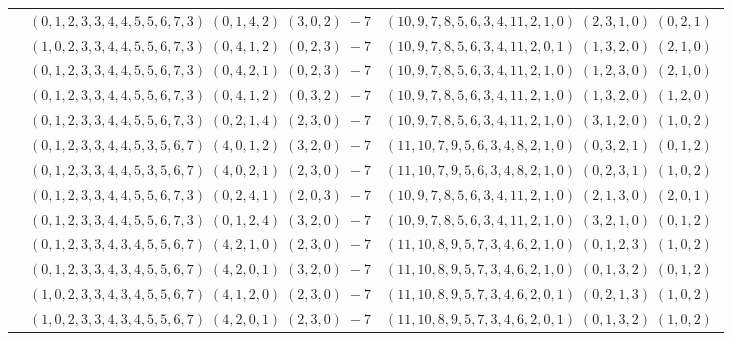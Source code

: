 \documentclass[11pt]{article}
\begin{document}
\begin{longtable}[l]{|c|c|c|}
 \cline{2-3} 
 & $(0 ,1 ,2 ,3 ,3 ,4 ,4 ,5 ,5 ,6 ,7 ,3) \;(0 ,1 ,4 ,2) \;(3 ,0 ,2) \;-7$ & $(10 ,9 ,7 ,8 ,5 ,6 ,3 ,4 ,11 ,2 ,1 ,0) \;(2 ,3 ,1 ,0) \;(0 ,2 ,1) \;$\\ 
 \cline{2-3} 
 & $(1 ,0 ,2 ,3 ,3 ,4 ,4 ,5 ,5 ,6 ,7 ,3) \;(0 ,4 ,1 ,2) \;(0 ,2 ,3) \;-7$ & $(10 ,9 ,7 ,8 ,5 ,6 ,3 ,4 ,11 ,2 ,0 ,1) \;(1 ,3 ,2 ,0) \;(2 ,1 ,0) \;$\\ 
 \cline{2-3} 
 & $(0 ,1 ,2 ,3 ,3 ,4 ,4 ,5 ,5 ,6 ,7 ,3) \;(0 ,4 ,2 ,1) \;(0 ,2 ,3) \;-7$ & $(10 ,9 ,7 ,8 ,5 ,6 ,3 ,4 ,11 ,2 ,1 ,0) \;(1 ,2 ,3 ,0) \;(2 ,1 ,0) \;$\\ 
 \cline{2-3} 
 & $(0 ,1 ,2 ,3 ,3 ,4 ,4 ,5 ,5 ,6 ,7 ,3) \;(0 ,4 ,1 ,2) \;(0 ,3 ,2) \;-7$ & $(10 ,9 ,7 ,8 ,5 ,6 ,3 ,4 ,11 ,2 ,1 ,0) \;(1 ,3 ,2 ,0) \;(1 ,2 ,0) \;$\\ 
 \cline{2-3} 
 & $(0 ,1 ,2 ,3 ,3 ,4 ,4 ,5 ,5 ,6 ,7 ,3) \;(0 ,2 ,1 ,4) \;(2 ,3 ,0) \;-7$ & $(10 ,9 ,7 ,8 ,5 ,6 ,3 ,4 ,11 ,2 ,1 ,0) \;(3 ,1 ,2 ,0) \;(1 ,0 ,2) \;$\\ 
 \cline{2-3} 
 & $(0 ,1 ,2 ,3 ,3 ,4 ,4 ,5 ,3 ,5 ,6 ,7) \;(4 ,0 ,1 ,2) \;(3 ,2 ,0) \;-7$ & $(11 ,10 ,7 ,9 ,5 ,6 ,3 ,4 ,8 ,2 ,1 ,0) \;(0 ,3 ,2 ,1) \;(0 ,1 ,2) \;$\\ 
 \cline{2-3} 
 & $(0 ,1 ,2 ,3 ,3 ,4 ,4 ,5 ,3 ,5 ,6 ,7) \;(4 ,0 ,2 ,1) \;(2 ,3 ,0) \;-7$ & $(11 ,10 ,7 ,9 ,5 ,6 ,3 ,4 ,8 ,2 ,1 ,0) \;(0 ,2 ,3 ,1) \;(1 ,0 ,2) \;$\\ 
 \cline{2-3} 
 & $(0 ,1 ,2 ,3 ,3 ,4 ,4 ,5 ,5 ,6 ,7 ,3) \;(0 ,2 ,4 ,1) \;(2 ,0 ,3) \;-7$ & $(10 ,9 ,7 ,8 ,5 ,6 ,3 ,4 ,11 ,2 ,1 ,0) \;(2 ,1 ,3 ,0) \;(2 ,0 ,1) \;$\\ 
 \cline{2-3} 
 & $(0 ,1 ,2 ,3 ,3 ,4 ,4 ,5 ,5 ,6 ,7 ,3) \;(0 ,1 ,2 ,4) \;(3 ,2 ,0) \;-7$ & $(10 ,9 ,7 ,8 ,5 ,6 ,3 ,4 ,11 ,2 ,1 ,0) \;(3 ,2 ,1 ,0) \;(0 ,1 ,2) \;$\\ 
 \cline{2-3} 
 & $(0 ,1 ,2 ,3 ,3 ,4 ,3 ,4 ,5 ,5 ,6 ,7) \;(4 ,2 ,1 ,0) \;(2 ,3 ,0) \;-7$ & $(11 ,10 ,8 ,9 ,5 ,7 ,3 ,4 ,6 ,2 ,1 ,0) \;(0 ,1 ,2 ,3) \;(1 ,0 ,2) \;$\\ 
 \cline{2-3} 
 & $(0 ,1 ,2 ,3 ,3 ,4 ,3 ,4 ,5 ,5 ,6 ,7) \;(4 ,2 ,0 ,1) \;(3 ,2 ,0) \;-7$ & $(11 ,10 ,8 ,9 ,5 ,7 ,3 ,4 ,6 ,2 ,1 ,0) \;(0 ,1 ,3 ,2) \;(0 ,1 ,2) \;$\\ 
 \cline{2-3} 
 & $(1 ,0 ,2 ,3 ,3 ,4 ,3 ,4 ,5 ,5 ,6 ,7) \;(4 ,1 ,2 ,0) \;(2 ,3 ,0) \;-7$ & $(11 ,10 ,8 ,9 ,5 ,7 ,3 ,4 ,6 ,2 ,0 ,1) \;(0 ,2 ,1 ,3) \;(1 ,0 ,2) \;$\\ 
 \cline{2-3} 
 & $(1 ,0 ,2 ,3 ,3 ,4 ,3 ,4 ,5 ,5 ,6 ,7) \;(4 ,2 ,0 ,1) \;(2 ,3 ,0) \;-7$ & $(11 ,10 ,8 ,9 ,5 ,7 ,3 ,4 ,6 ,2 ,0 ,1) \;(0 ,1 ,3 ,2) \;(1 ,0 ,2) \;$\\ 

\end{longtable}
\end{document}
